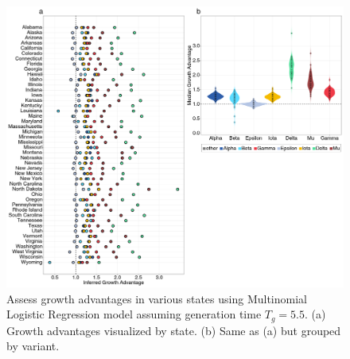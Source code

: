 \documentclass[12pt]{article}
\begin{document}
\begin{figure}
  \centering
  \includegraphics[width=\linewidth]{figs/fig_MLR_growth_advantages_supp.png}
  \caption{Assess growth advantages in various states using Multinomial Logistic Regression model assuming generation time $T_{g} = 5.5$. 
  (a) Growth advantages visualized by state.
  (b) Same as (a) but grouped by variant.}%
  \label{fig:MLR_growth_advantages}
\end{figure}


\end{document}
